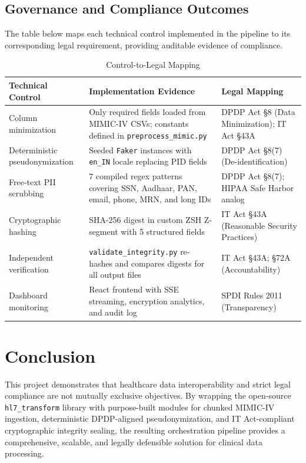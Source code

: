 \documentclass[12pt,a4paper]{report}
\begin{document}
\subsection{Governance and Compliance Outcomes}

The table below maps each technical control implemented in the pipeline to its
corresponding legal requirement, providing auditable evidence of compliance.

\begin{table}[H]
\centering
\caption{Control-to-Legal Mapping}
\begin{tabular}{p{3.5cm} p{5cm} p{4.5cm}}
\toprule
Technical Control & Implementation Evidence & Legal Mapping \\
\midrule
Column minimization & Only required fields loaded from MIMIC-IV CSVs; constants
defined in \texttt{preprocess\_mimic.py} & DPDP Act §8 (Data Minimization); IT Act
§43A \\[0.4em]
Deterministic pseudo\-nymization & Seeded \texttt{Faker} instances with
\texttt{en\_IN} locale replacing PID fields & DPDP Act §8(7) (De-identification)
\\[0.4em]
Free-text PII scrubbing & 7 compiled regex patterns covering SSN, Aadhaar, PAN,
email, phone, MRN, and long IDs & DPDP Act §8(7); HIPAA Safe Harbor analog
\\[0.4em]
Cryptographic hashing & SHA-256 digest in custom ZSH Z-segment with 5 structured
fields & IT Act §43A (Reasonable Security Practices) \\[0.4em]
Independent verification & \texttt{validate\_integrity.py} re-hashes and compares
digests for all output files & IT Act §43A; §72A (Accountability) \\[0.4em]
Dashboard monitoring & React frontend with SSE streaming, encryption analytics,
and audit log & SPDI Rules 2011 (Transparency) \\
\bottomrule
\end{tabular}
\end{table}

\section{Conclusion}

This project demonstrates that healthcare data interoperability and strict legal
compliance are not mutually exclusive objectives. By wrapping the open-source
\texttt{hl7\_transform} library with purpose-built modules for chunked MIMIC-IV
ingestion, deterministic DPDP-aligned pseudonymization, and IT Act-compliant
cryptographic integrity sealing, the resulting orchestration pipeline provides a
comprehensive, scalable, and legally defensible solution for clinical data processing.
\end{document}
